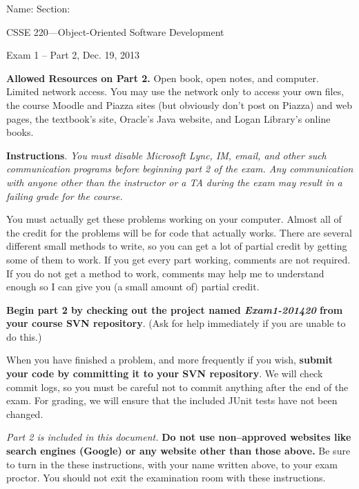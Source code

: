 \documentclass[12pt,twoside]{article}
\newcommand{\fillInBlank}[1][0.5in]{\underline{\hspace{#1}}}
\begin{document}

\begin{flushright}
Name: \fillInBlank[3in] Section: \fillInBlank[1in]

\LARGE{CSSE 220---Object-Oriented Software Development}

\Large{Exam 1 -- Part 2, Dec. 19, 2013}
\end{flushright}

\textbf{Allowed Resources on Part 2.} \hspace{0.15in}
Open book, open notes, and computer. Limited network access. You may use the network only to access your own files, the course Moodle and Piazza sites (but obviously don't post on Piazza) and web pages, the textbook's site, Oracle's Java website, and Logan Library's online books.


\textbf{Instructions}.\hspace{0.15in}
\emph{You must disable Microsoft Lync, IM, email, and other such communication programs
before beginning part 2 of the exam. Any communication with anyone other than the instructor
or a TA during the exam may result in a failing grade for the course.}

You must actually get these problems working on your computer. Almost all of the credit for the problems will be for code that actually works. There are several different small methods to write, so you can get a lot of partial credit by getting some of them to work.  If you get every part working, comments are not required.  If you do not get a method to work, comments may help me to understand enough so I can give you (a small amount of) partial credit.  

\textbf{Begin part 2 by checking out the project named \emph{Exam1-201420} from your course SVN repository}.  (Ask for help immediately if you are unable to do this.)

When you have finished a problem, and more frequently if you wish, \textbf{submit your code by committing it to your SVN repository}.  We will check commit logs, so you must be careful not to commit anything after the end of the exam.  For grading, we will ensure that the included JUnit tests have not been changed.

\emph{Part 2 is included in this document.}
\textbf{Do not use non--approved websites like search engines (Google) or any website other than those above.}  Be sure to turn in the these instructions, with your name written above, to your exam proctor. You should not exit the examination room with these instructions.
\end{document}
